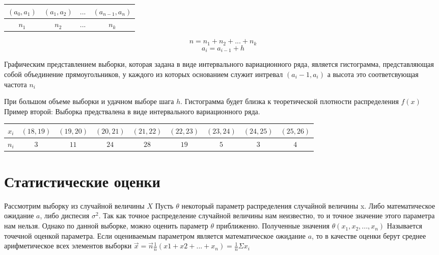 \documentclass[a4paper]{article}
\begin{document}
\begin{table}[H]
    \centering
    \begin{tabular}{|c|c|c|c|}
\hline
$(a_0, a_1)$ & $(a_1, a_2)$ & $...$ & $(a_{n-1}, a_{n})$\\
\hline
$n_1$ & $n_2$ & $...$ & $n_k$ \\
\hline
\end{tabular}
\end{table}

$$n = n_1 + n_2 + ... + n_k$$
$$a_i = a_{i-1} + h$$

Графическим представлением выборки, которая задана в виде интервального вариационного ряда, является гистограмма, представляющая собой объединение прямоугольников, у каждого из которых основанием служит интревал $(a_i-1, a_i)$
а высота это соответсвующая частота $n_i$
    
При большом объеме выборки и удачном выборе шага $h$. Гистограмма будет близка к теоретической плотности распределения $f(x)$
Пример второй:
Выборка предствалена в виде интервального вариационного ряда.
\begin{table}[H]
    \centering
    \begin{tabular}{|c|c|c|c|c|c|c|c|c|}
        \hline
        $x_i$ & $(18, 19)$ & $(19, 20)$ & $(20, 21)$ & $(21, 22)$ & $(22, 23)$ & $(23, 24)$ & $(24, 25)$ & $(25, 26)$\\
        \hline
        $n_i$ & $3$ & $11$ & $24$ & $28$ & $19$ & $5$ & $3$ & $4$\\
        \hline
    \end{tabular}
\end{table}

\section{Статистические оценки}

Рассмотрим выборку из случайной величины $X$
Пусть $\theta$ некоторый параметр распределения случайной величины x. Либо математическое ожидание $a$, либо диспесия $\sigma^2$. Так как точное распределение случайной величины нам неизвестно, то и точное значение этого параметра нам нельзя. Однако по данной выборке, можно оценить параметр $\theta$ приближенно. Полученные значения $\theta(x_1, x_2, ..., x_n)$
Называется точечной оценкой параметра. Если оцениваемым параметром является математическое ожидание $a$, то в качестве оценки берут среднее арифметическое всех элементов выборки 
$ \vec{x} = \vec{n} \frac{1}{n}(x1 + x2 + ... + x_n) = \frac{1}{n}\Sigma x_i$
\end{document}
